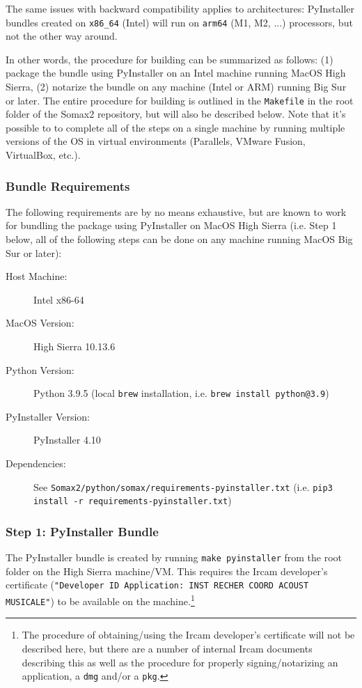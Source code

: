 The same issues with backward compatibility applies to architectures: PyInstaller bundles created on \texttt{x86\_64} (Intel) will run on \texttt{arm64} (M1, M2, ...) processors, but not the other way around. 

In other words, the procedure for building can be summarized as follows: (1) package the bundle using PyInstaller on an Intel machine running MacOS High Sierra, (2) notarize the bundle on any machine (Intel or ARM) running Big Sur or later. The entire procedure for building is outlined in the \texttt{Makefile} in the root folder of the Somax2 repository, but will also be described below. Note that it's possible to to complete all of the steps on a single machine by running multiple versions of the OS in virtual environments (Parallels, VMware Fusion, VirtualBox, etc.).

\subsubsection{Bundle Requirements}
The following requirements are by no means exhaustive, but are known to work for bundling the package using PyInstaller on MacOS High Sierra (i.e. Step 1 below, all of the following steps can be done on any machine running MacOS Big Sur or later):

\begin{description}
	\item [Host Machine:] Intel x86-64
	\item [MacOS Version:] High Sierra 10.13.6
	\item [Python Version:] Python 3.9.5 (local \texttt{brew} installation, i.e. \texttt{brew install python@3.9})
	\item [PyInstaller Version:] PyInstaller 4.10
	\item [Dependencies:] See \texttt{Somax2/python/somax/requirements-pyinstaller.txt} (i.e. \texttt{pip3 install -r requirements-pyinstaller.txt})
\end{description}

\subsubsection{Step 1: PyInstaller Bundle}
The PyInstaller bundle is created by running \texttt{make pyinstaller} from the root folder on the High Sierra machine/VM. This requires the Ircam developer's certificate (\texttt{"Developer ID Application: INST RECHER COORD ACOUST MUSICALE"}) to be available on the machine.\footnote{The procedure of obtaining/using the Ircam developer's certificate will not be described here, but there are a number of internal Ircam documents describing this as well as the procedure for properly signing/notarizing an application, a \texttt{dmg} and/or a \texttt{pkg}.} 

